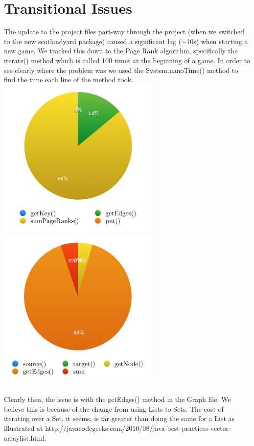 \documentclass[a4paper, 12pt]{article}
\begin{document}
\section{Transitional Issues}
The update to the project files part-way through the project (when we switched to the new scotlandyard package) caused a significant lag ($\sim$10s) when starting a new game. We tracked this down to the Page Rank algorithm, specifically the iterate() method which is called 100 times at the beginning of a game. In order to see clearly where the problem was we used the System.nanoTime() method to find the time each line of the method took.\\
\includegraphics[width = 8cm]{iterate}
\includegraphics[width = 8cm]{sumPageRanks}\\
\\
Clearly then, the issue is with the getEdges() method in the Graph file. We believe this is because of the change from using Lists to Sets. The cost of iterating over a Set, it seems, is far greater than doing the same for a List as illustrated at http://javacodegeeks.com/2010/08/java-best-practices-vector-arraylist.html.\\
\end{document}
